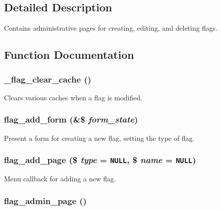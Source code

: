 \subsection{Detailed Description}
Contains administrative pages for creating, editing, and deleting flags. 

\subsection{Function Documentation}
\hypertarget{flag_8admin_8inc_536576b3f0495a064f0941d1e070964f}{
\subsubsection[{\_\-flag\_\-clear\_\-cache}]{\setlength{\rightskip}{0pt plus 5cm}\_\-flag\_\-clear\_\-cache ()}}
\label{flag_8admin_8inc_536576b3f0495a064f0941d1e070964f}


Clears various caches when a flag is modified. \hypertarget{flag_8admin_8inc_8ad4dca3c0dbf588e00bbb28e7ceb53f}{
\subsubsection[{flag\_\-add\_\-form}]{\setlength{\rightskip}{0pt plus 5cm}flag\_\-add\_\-form (\&\$ {\em form\_\-state})}}
\label{flag_8admin_8inc_8ad4dca3c0dbf588e00bbb28e7ceb53f}


Present a form for creating a new flag, setting the type of flag. \hypertarget{flag_8admin_8inc_8af993acc60c3b818942d8177d1525aa}{
\subsubsection[{flag\_\-add\_\-page}]{\setlength{\rightskip}{0pt plus 5cm}flag\_\-add\_\-page (\$ {\em type} = {\tt NULL}, \/  \$ {\em name} = {\tt NULL})}}
\label{flag_8admin_8inc_8af993acc60c3b818942d8177d1525aa}


Menu callback for adding a new flag. \hypertarget{flag_8admin_8inc_4836a38f1988d95bbbe667f4696d9d33}{
\subsubsection[{flag\_\-admin\_\-page}]{\setlength{\rightskip}{0pt plus 5cm}flag\_\-admin\_\-page ()}}
\label{flag_8admin_8inc_4836a38f1988d95bbbe667f4696d9d33}


